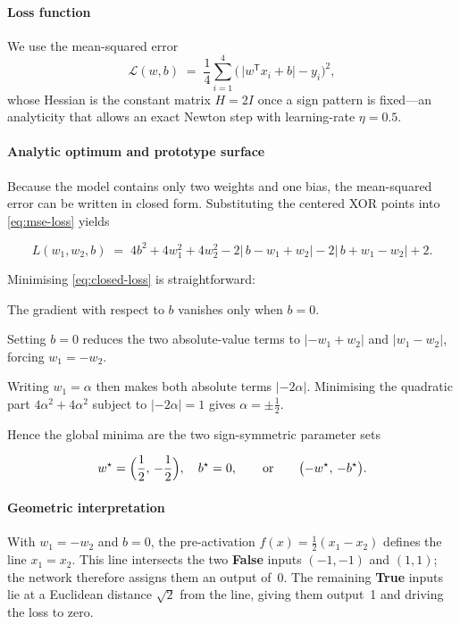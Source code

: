 \paragraph{Loss function}
We use the mean-squared error
\begin{equation}
    \mathcal{L}(w,b)
    \;=\;
    \frac{1}{4} \sum_{i=1}^{4} 
    \bigl(\,\lvert w^{\mathsf T}x_i + b\rvert - y_i\bigr)^2,
    \label{eq:mse-loss}
\end{equation}
whose Hessian is the constant matrix \(H = 2I\) once a sign pattern is
fixed—an analyticity that allows an exact Newton step with learning-rate
\(\eta = 0.5\).

\paragraph{Analytic optimum and prototype surface}
Because the model contains only two weights and one bias, the mean-squared
error can be written in closed form.  Substituting the centered XOR points into
\eqref{eq:mse-loss} yields

\[
  L(w_1,w_2,b)\;=\;
  4b^2 + 4w_1^2 + 4w_2^2
  - 2\bigl|\,b-w_1+w_2\bigr|
  - 2\bigl|\,b+w_1-w_2\bigr| + 2.
  \tag{1}\label{eq:closed-loss}
\]

Minimising \eqref{eq:closed-loss} is straightforward:

\begin{enumerate*}[label=(\roman*)]
  \item The gradient with respect to \(b\) vanishes only when
        \(b = 0\).
  \item Setting \(b=0\) reduces the two absolute-value terms to
        \(\lvert -w_1+w_2\rvert\) and \(\lvert w_1-w_2\rvert\),
        forcing \(w_1 = -w_2\).
  \item Writing \(w_1 = \alpha\) then makes both absolute terms
        \(\lvert -2\alpha\rvert\).  Minimising the quadratic part
        \(4\alpha^2 + 4\alpha^2\) subject to
        \(\lvert -2\alpha\rvert = 1\) gives \(\alpha = \pm\tfrac12\).
\end{enumerate*}

Hence the global minima are the two sign-symmetric parameter sets

\[
  w^\star = \Bigl(\frac12,\,-\frac12\Bigr),\quad b^\star = 0,
  \qquad\text{or}\qquad
  \bigl(-w^\star,\,-b^\star\bigr).
\]

\paragraph{Geometric interpretation}
With \(w_1=-w_2\) and \(b=0\), the pre-activation
\(f(x)=\tfrac12(x_1-x_2)\) defines the line \(x_1=x_2\).
This line intersects the two \textbf{False} inputs
\(({-}1,{-}1)\) and \((1,1)\); the network therefore assigns them an output
of~0.  
The remaining \textbf{True} inputs lie at a Euclidean distance
\(\sqrt2\) from the line, giving them output~1 and driving the loss to zero.


